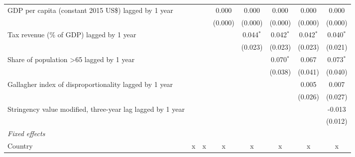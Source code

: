 \begin{tabular}{lccccccc}
   GDP per capita (constant 2015 US\$) lagged by 1 year                                                  &              &             & 0.000        & 0.000       & 0.000       & 0.000       & 0.000\\   
                                                                                                         &              &             & (0.000)      & (0.000)     & (0.000)     & (0.000)     & (0.000)\\   
   Tax revenue (\% of GDP) lagged by 1 year                                                              &              &             &              & 0.044$^{*}$ & 0.042$^{*}$ & 0.042$^{*}$ & 0.040$^{*}$\\   
                                                                                                         &              &             &              & (0.023)     & (0.023)     & (0.023)     & (0.021)\\   
   Share of population >65 lagged by 1 year                                                              &              &             &              &             & 0.070$^{*}$ & 0.067       & 0.073$^{*}$\\   
                                                                                                         &              &             &              &             & (0.038)     & (0.041)     & (0.040)\\   
   Gallagher index of disproportionality lagged by 1 year                                                &              &             &              &             &             & 0.005       & 0.007\\   
                                                                                                         &              &             &              &             &             & (0.026)     & (0.027)\\   
   Stringency value modified, three-year lag lagged by 1 year                                            &              &             &              &             &             &             & -0.013\\   
                                                                                                         &              &             &              &             &             &             & (0.012)\\   
   \emph{Fixed effects}\\
   Country                                                                                               & x            & x           & x            & x           & x           & x           & x\\  

\end{tabular}
